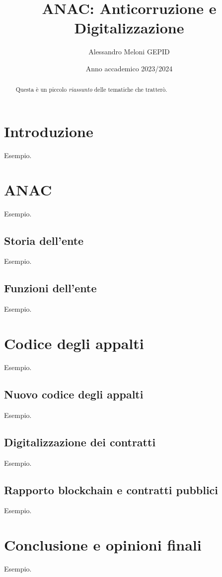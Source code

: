\documentclass{article}
\title{ANAC: Anticorruzione e Digitalizzazione}
\author{Alessandro Meloni GEPID}
\date{Anno accademico 2023/2024}
\begin{document}
\maketitle
\begin{abstract}
    Questa è un piccolo \textit{riassunto} delle tematiche che tratterò.
\end{abstract}

\centering \tableofcontents
\newpage\centering
\section{Introduzione}
\flushleft 
Esempio.
\newpage\centering
\section{ANAC}
\flushleft Esempio.

\flushleft \subsection{Storia dell'ente}
Esempio.
\flushleft \subsection{Funzioni dell'ente}
Esempio.
\newpage\centering
\section{Codice degli appalti}
\flushleft Esempio.

\flushleft \subsection{Nuovo codice degli appalti}
Esempio.
\flushleft \subsection{Digitalizzazione dei contratti}
Esempio.
\flushleft \subsection{Rapporto blockchain e contratti pubblici}
Esempio.

\newpage \centering
\section{Conclusione e opinioni finali}
\flushleft Esempio.
\end{document}
